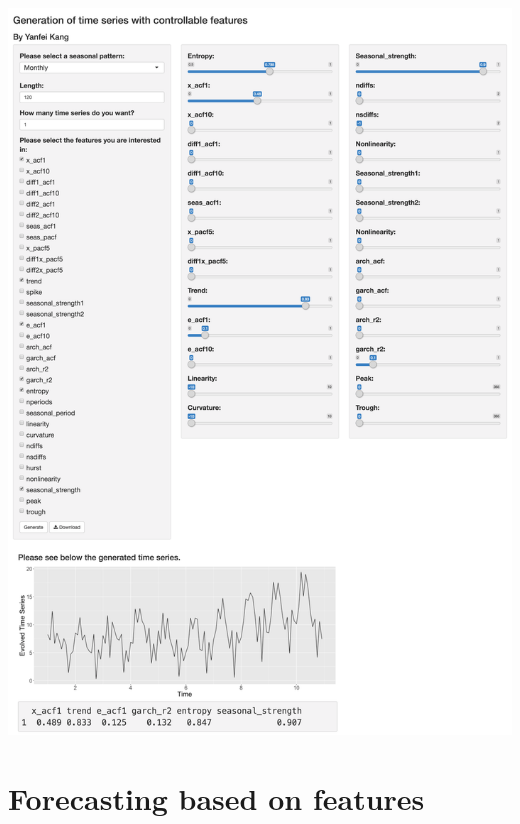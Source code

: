 \documentclass[11pt,ignorenonframetext,compress]{beamer}
\begin{document}
\begin{frame}{}

  \centerline{\includegraphics[height=1.05\textheight]{figures/TSgenerationApp}}

\end{frame}

\section{Forecasting based on
  features}\label{forecasting-based-on-features}
\end{document}
